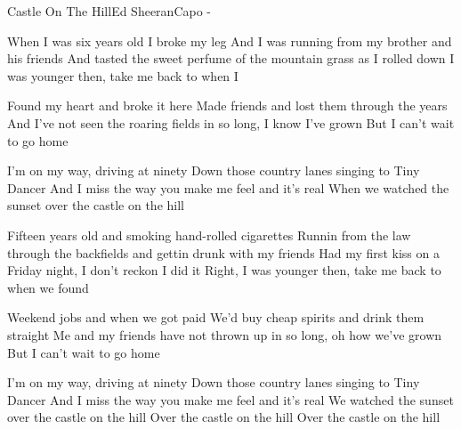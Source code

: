 \begin{song}{Castle On The Hill}{Ed Sheeran}{Capo -}

When I was six years old I broke my leg
  And I was running  from my brother and his friends
  And tasted the sweet perfume of the mountain grass as I rolled down
  I was younger  then,  take me back to when I

  Found my heart and broke it here
  Made friends and lost them through the years
  And I've not seen the roaring fields in so long, I know I've grown
  But I can't wait to go home

  I'm on my   way, driving at ninety
  Down those country  lanes singing to Tiny Dancer
  And I miss the  way you make  me feel      and it's real
  When we watched the  sunset over the castle on the hill

Fifteen years old and smoking hand-rolled cigarettes
Runnin from the law through the backfields and gettin drunk with my friends
  Had my first kiss on a Friday night, I don't reckon I did it
Right, I was younger  then,  take me back to when we found

  Weekend jobs and when we got paid
  We'd buy cheap spirits and drink them straight
  Me and my friends have not thrown up in so long, oh how we've grown
  But I can't wait to go home

  I'm on my   way, driving at ninety
  Down those country  lanes singing to Tiny Dancer
  And I miss the  way you make  me feel      and it's real
  We watched the  sunset over the castle on the hill
              Over the castle on the hill
              Over the castle on the hill


\end{song}
